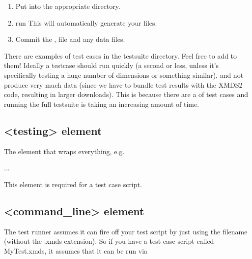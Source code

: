 \documentclass[letterpaper,10pt,english]{sphinxmanual}
\begin{document}
\begin{enumerate}
%
\setcounter{enumi}{2}
\item {} 
\sphinxAtStartPar
Put into the appropriate  directory.

\item {} 
\sphinxAtStartPar
run  This will automatically generate your  files.

\item {} 
\sphinxAtStartPar
Commit the ,  file and any  data files.

\end{enumerate}

\sphinxAtStartPar
There are examples of test cases in the testsuite directory. Feel free to add to them! Ideally a testcase should run quickly (a second or less, unless it’s specifically testing a huge number of dimensions or something similar), and not produce very much data (since we have to bundle test results with the XMDS2 code, resulting in larger downloads). This is because there are a  of test cases and running the full testsuite is taking an increasing amount of time.


\subsection{\textless{}testing\textgreater{} element}
\label{\detokenize{developer:testing-element}}\label{\detokenize{developer:testingelement}}
\sphinxAtStartPar
The element that wraps everything, e.g.

\begin{sphinxVerbatim}[commandchars=\\\{\}]
   ...
\end{sphinxVerbatim}

\sphinxAtStartPar
This element is required for a test case script.


\subsection{\textless{}command\_line\textgreater{} element}
\label{\detokenize{developer:command-line-element}}\label{\detokenize{developer:commandlineelement}}
\sphinxAtStartPar
The test runner assumes it can fire off your test script by just using the filename (without the .xmds extension). So if you have a test case script called MyTest.xmds, it assumes that it can be run via
\end{document}
